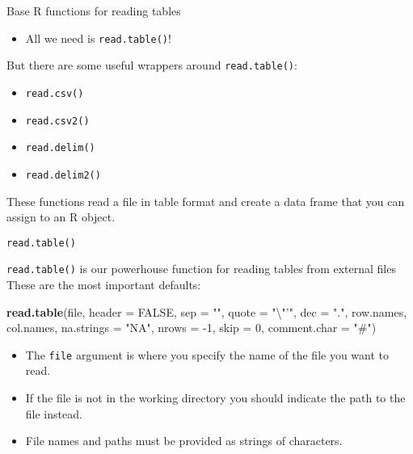 \documentclass[ignorenonframetext,]{beamer}
\newenvironment{Shaded}{\begin{snugshade}}{\end{snugshade}}
\newcommand{\CharTok}[1]{\textcolor[rgb]{0.31,0.60,0.02}{#1}}
\newcommand{\DataTypeTok}[1]{\textcolor[rgb]{0.13,0.29,0.53}{#1}}
\newcommand{\DecValTok}[1]{\textcolor[rgb]{0.00,0.00,0.81}{#1}}
\newcommand{\KeywordTok}[1]{\textcolor[rgb]{0.13,0.29,0.53}{\textbf{#1}}}
\newcommand{\NormalTok}[1]{#1}
\newcommand{\OtherTok}[1]{\textcolor[rgb]{0.56,0.35,0.01}{#1}}
\newcommand{\StringTok}[1]{\textcolor[rgb]{0.31,0.60,0.02}{#1}}
\providecommand{\tightlist}{%
  \setlength{\itemsep}{0pt}\setlength{\parskip}{0pt}}
\begin{document}
\begin{frame}[fragile]{Base R functions for reading tables}
\protect\hypertarget{base-r-functions-for-reading-tables}{}

\begin{itemize}
\tightlist
\item
  All we need is \texttt{read.table()}!
\end{itemize}

But there are some useful wrappers around \texttt{read.table()}:

\begin{itemize}
\tightlist
\item
  \texttt{read.csv()}
\item
  \texttt{read.csv2()}
\item
  \texttt{read.delim()}
\item
  \texttt{read.delim2()}
\end{itemize}

These functions read a file in table format and create a data frame that
you can assign to an R object.

\end{frame}

\begin{frame}[fragile]{\texttt{read.table()}}
\protect\hypertarget{read.table}{}

\texttt{read.table()} is our powerhouse function for reading tables from
external files These are the most important defaults:

\begin{Shaded}
\begin{Highlighting}[]
\KeywordTok{read.table}\NormalTok{(file, }\DataTypeTok{header =} \OtherTok{FALSE}\NormalTok{, }\DataTypeTok{sep =} \StringTok{""}\NormalTok{, }
           \DataTypeTok{quote =} \StringTok{"}\CharTok{\textbackslash{}"}\StringTok{'"}\NormalTok{, }\DataTypeTok{dec =} \StringTok{"."}\NormalTok{, row.names,}
\NormalTok{           col.names, }\DataTypeTok{na.strings =} \StringTok{"NA"}\NormalTok{, }
           \DataTypeTok{nrows =} \DecValTok{-1}\NormalTok{, }\DataTypeTok{skip =} \DecValTok{0}\NormalTok{, }\DataTypeTok{comment.char =} \StringTok{"#"}\NormalTok{)}
\end{Highlighting}
\end{Shaded}

\begin{itemize}
\tightlist
\item
  The \texttt{file} argument is where you specify the name of the file
  you want to read.
\item
  If the file is not in the working directory you should indicate the
  path to the file instead.
\item
  File names and paths must be provided as strings of characters.
\end{itemize}

\end{frame}
\end{document}
